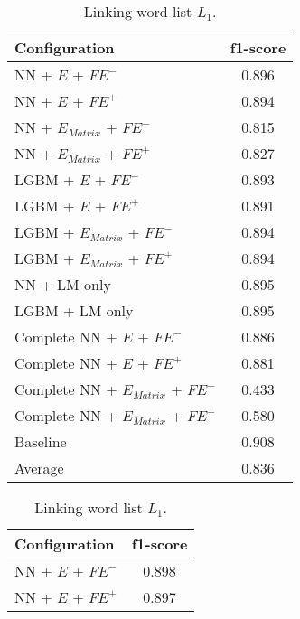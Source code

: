 \begin{table}[h]
  	\tiny
  	\centering
	\begin{subtable}{.5\textwidth}
		\centering
  		\renewcommand{\arraystretch}{1.4}
   		\begin{tabular}{|| l || c ||}
   			\hline
   			{Configuration} & {f1-score} \\
   			\hline\hline
   			NN + $E$ + $\textit{FE}^-$ &  0.896 \\
 			\hline
 			NN + $E$ + $\textit{FE}^+$ & 0.894 \\
 			\hline
 			NN + $E_{Matrix}$ + $\textit{FE}^-$ & 0.815 \\
 			\hline
 			NN + $E_{Matrix}$ + $\textit{FE}^+$ & 0.827 \\
 			\hline
 			LGBM + $E$ + $\textit{FE}^-$ & 0.893 \\
 			\hline
 			LGBM + $E$ + $\textit{FE}^+$ & 0.891 \\
 			\hline
 			LGBM + $E_{Matrix}$ + $\textit{FE}^-$ & 0.894 \\
 			\hline
 			LGBM + $E_{Matrix}$ + $\textit{FE}^+$ & 0.894 \\
 			\hline
 			NN + LM only & 0.895 \\
 			\hline
 			LGBM + LM only & 0.895 \\
 			\hline
 			Complete NN + $E$ + $\textit{FE}^-$ & 0.886 \\
 			\hline
 			Complete NN + $E$ + $\textit{FE}^+$ & 0.881 \\
 			\hline
 			Complete NN + $E_{Matrix}$ + $\textit{FE}^-$ & 0.433 \\
 			\hline
 			Complete NN + $E_{Matrix}$ + $\textit{FE}^+$ & 0.580 \\
 			\hline
 			Baseline & 0.908 \\
 			\hline
 			\hline
 			Average & 0.836 \\
 			\hline
		\end{tabular}
		\renewcommand{\arraystretch}{1}
  		\caption{Linking word list $L_1$.}%
  	\end{subtable}%
  	\begin{subtable}{.5\textwidth}
		\centering
  		\renewcommand{\arraystretch}{1.4}
   		\begin{tabular}{|| l || c ||}
   			\hline
   			{Configuration} & {f1-score} \\
   			\hline\hline
   			NN + $E$ + $\textit{FE}^-$ &  0.898 \\
 			\hline
 			NN + $E$ + $\textit{FE}^+$ & 0.897 \\

\end{tabular}
\end{subtable}
\end{table}

